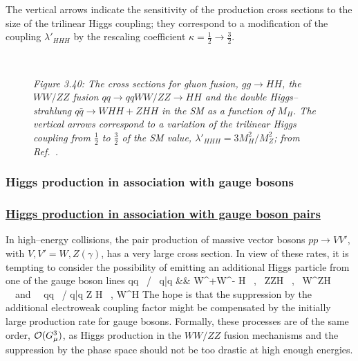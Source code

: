 The vertical arrows indicate the sensitivity of the production cross sections
to the size of the trilinear Higgs coupling; they correspond to a modification
of the coupling $\lambda'_{HHH}$ by the rescaling coefficient
$\kappa=\frac{1}{2} \to \frac{3}{2}$. 

\begin{figure}[htbp]
\begin{center}
\\[3mm]
\end{center}
\vspace*{-3mm}
{\it Figure 3.40: The cross sections for gluon fusion, $gg \to HH$, the $WW/ZZ$
fusion $qq \to qqWW/ZZ \to HH$ and the double Higgs--strahlung $q\bar{q} \to 
WHH+ ZHH$ in the SM as a function of $M_H$. The vertical arrows  correspond to a
variation of the trilinear Higgs coupling from $\frac{1}{2}$  to $\frac{3}{2}$ 
of the SM value, $\lambda'_{HHH}=3 M_H^2/M_Z^2$; from Ref.~\cite{pp-DKMZ}.}
\end{figure}

\subsubsection{Higgs production in association with gauge bosons}

\subsubsection*{\underline{Higgs production in association with gauge boson
pairs}}

In high--energy collisions, the pair production of massive vector bosons $pp
\to VV'$, with $V,V'=W,Z (\gamma)$, has a very large cross section. In view of 
these rates, it is tempting to consider the possibility of emitting an 
additional Higgs particle from one of the gauge boson  lines \cite{pp-HVV,DWP}
\beq 
qq \, / \, q\bar{q} &\to & W^+W^- H \,  , \, ZZH \, , \, W^\pm ZH
\ \ {\rm and} \ \ qq \, / q\bar{q} \to  \gamma Z H \ , \gamma W^\pm H  
\label{qqHVV}
\eeq
The hope is that the suppression by the additional electroweak coupling factor 
might be compensated by the initially large production rate for gauge bosons. 
Formally, these processes are of the same order, ${\cal O}(G_\mu^3)$, as Higgs 
production in the $WW/ZZ$ fusion mechanisms and the suppression by the phase
space should not be too drastic at high enough energies. 

